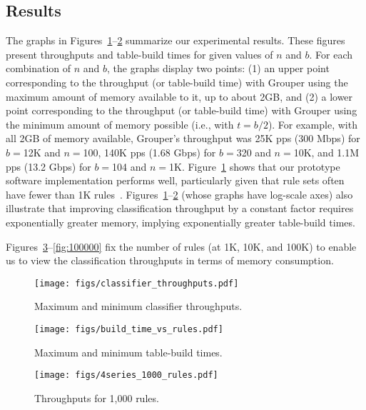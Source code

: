 \documentclass[10pt, conference, compsocconf]{IEEEtran}
\begin{document}
\subsection{Results}

The graphs in Figures~\ref{fig:tputs}--\ref{fig:build-times} summarize our
experimental results.  These figures present throughputs and table-build times
for given values of $n$ and $b$. For each combination of $n$ and $b$, the graphs
display two points: (1) an upper point corresponding to the throughput (or
table-build time) with Grouper using the maximum amount of memory available to
it, up to about 2GB, and (2) a lower point corresponding to the throughput (or
table-build time) with Grouper using the minimum amount of memory possible
(i.e., with $t=b/2$).  For example, with all 2GB of memory available, Grouper's
throughput was 25K pps (300 Mbps) for $b{=}$12K and $n{=}$100, 140K pps (1.68
Gbps) for $b{=}$320 and $n{=}$10K, and 1.1M pps (13.2 Gbps) for $b{=}$104 and
$n{=}$1K.  Figure~\ref{fig:tputs} shows that our prototype software
implementation performs well, particularly given that rule sets often have fewer
than 1K rules~\cite{pankaj+,num-rules}.
Figures~\ref{fig:tputs}--\ref{fig:build-times} (whose graphs have log-scale
axes) also illustrate that improving classification throughput by a constant
factor requires exponentially greater memory, implying exponentially greater
table-build times.

Figures~\ref{fig:1000}--\ref{fig:100000} fix the number of rules (at 1K, 10K,
and 100K) to enable us to view the classification throughputs in terms of memory
consumption.

\begin{figure}
\vspace{-.2in}
\hspace{-.08in}\texttt{[image: figs/classifier\_throughputs.pdf]}
\vspace{-.3in}
\caption{Maximum and minimum classifier throughputs.}\label{fig:tputs}
\end{figure}

\begin{figure}
\vspace{-.2in}
\hspace{-.08in}\texttt{[image: figs/build\_time\_vs\_rules.pdf]}
\vspace{-.3in}
\caption{Maximum and minimum table-build times.}\label{fig:build-times}
\end{figure}

\begin{figure}
\vspace{-.2in}
\hspace{-.08in}\texttt{[image: figs/4series\_1000\_rules.pdf]}
\vspace{-.3in}
\caption{Throughputs for 1,000 rules.}\label{fig:1000}
\end{figure}
\end{document}
